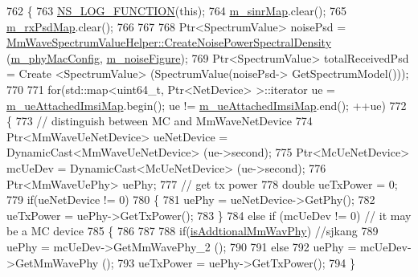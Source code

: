 \begin{DoxyCode}
762 \{
763     \hyperlink{log-macros-disabled_8h_a90b90d5bad1f39cb1b64923ea94c0761}{NS\_LOG\_FUNCTION}(\textcolor{keyword}{this});
764         \hyperlink{classns3_1_1MmWaveEnbPhy_a754de7cf4bdbe107dfb006a5b332842a}{m\_sinrMap}.clear();
765         \hyperlink{classns3_1_1MmWaveEnbPhy_a40b3813d00f430aed47e1ee084df4d78}{m\_rxPsdMap}.clear();
766         
767 
768         Ptr<SpectrumValue> noisePsd = 
      \hyperlink{classns3_1_1MmWaveSpectrumValueHelper_ae17f7f89a0ce6934b94886b463c6db44}{MmWaveSpectrumValueHelper::CreateNoisePowerSpectralDensity}
       (\hyperlink{classns3_1_1MmWavePhy_a869abf36bbdbb94eed77ba6e4846f6e4}{m\_phyMacConfig}, \hyperlink{classns3_1_1MmWavePhy_ac3010f7611906c8dc5e93bc13ff79819}{m\_noiseFigure});
769         Ptr<SpectrumValue> totalReceivedPsd = Create <SpectrumValue> (SpectrumValue(noisePsd->
      GetSpectrumModel()));
770 
771         \textcolor{keywordflow}{for}(std::map<uint64\_t, Ptr<NetDevice> >::iterator ue = 
      \hyperlink{classns3_1_1MmWaveEnbPhy_a1e8b3730ff37d9fc19d9ec07f06e6be5}{m\_ueAttachedImsiMap}.begin(); ue != \hyperlink{classns3_1_1MmWaveEnbPhy_a1e8b3730ff37d9fc19d9ec07f06e6be5}{m\_ueAttachedImsiMap}.end(); ++ue)
772         \{
773                 \textcolor{comment}{// distinguish between MC and MmWaveNetDevice}
774                 Ptr<MmWaveUeNetDevice> ueNetDevice = DynamicCast<MmWaveUeNetDevice> (ue->second);
775                 Ptr<McUeNetDevice> mcUeDev = DynamicCast<McUeNetDevice> (ue->second);
776                 Ptr<MmWaveUePhy> uePhy;
777                 \textcolor{comment}{// get tx power}
778                 \textcolor{keywordtype}{double} ueTxPower = 0;
779                 \textcolor{keywordflow}{if}(ueNetDevice != 0) 
780                 \{
781                         uePhy = ueNetDevice->GetPhy();
782                         ueTxPower = uePhy->GetTxPower();
783                 \}
784                 \textcolor{keywordflow}{else} \textcolor{keywordflow}{if} (mcUeDev != 0) \textcolor{comment}{// it may be a MC device}
785                 \{
786                         
787 
788                         \textcolor{keywordflow}{if}(\hyperlink{classns3_1_1MmWaveEnbPhy_a1a171ed81b1efedf963000d89f2cbd98}{isAddtionalMmWavPhy}) \textcolor{comment}{//sjkang}
789                                 uePhy = mcUeDev->GetMmWavePhy\_2 ();
790 
791                         \textcolor{keywordflow}{else}
792                                 uePhy = mcUeDev->GetMmWavePhy ();
793                         ueTxPower = uePhy->GetTxPower();        
794                 \}

\end{DoxyCode}
